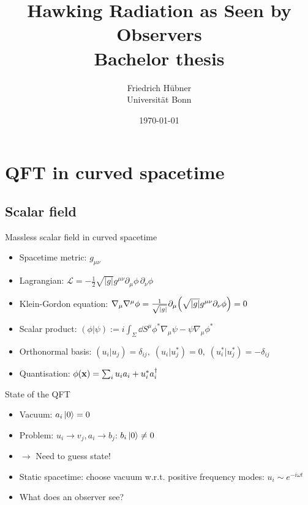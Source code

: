 \documentclass{beamer}
\title[Hawking Radiation for Observers]{\vspace{1cm}Hawking Radiation as Seen by Observers\\\small{Bachelor thesis}}
\author[Friedrich Hübner]{Friedrich Hübner\\Universität Bonn}
\date{\today}
\begin{document}
\beamertemplatenavigationsymbolsempty
\titlepage

\frame{\tableofcontents}

\section{QFT in curved spacetime}
\subsection{Scalar field}
\begin{frame}{Massless scalar field in curved spacetime}
\begin{itemize}
	\item Spacetime metric: \(g_{\mu\nu}\)
	\item Lagrangian: \(\mathcal{L} = -\frac{1}{2}\sqrt{|g|} g^{\mu\nu} \partial_\mu \phi\,\partial_\nu \phi\)
	\item Klein-Gordon equation: \(\nabla_\mu\nabla^\mu \phi = \frac{1}{\sqrt{|g|}}\partial_\mu \qty(\sqrt{|g|} g^{\mu\nu} \partial_\nu \phi) = 0\)
	\item Scalar product: \((\phi|\psi) := i \int_{\Sigma}\dd{S^\mu} \phi^*\nabla_\mu \psi - \psi\nabla_\mu \phi^*\)
	\item Orthonormal basis: \((u_i|u_j) = \delta_{ij},\;(u_i|u_j^*) = 0,\;(u_i^*|u_j^*) = -\delta_{ij}\)
	\item Quantisation: \(\phi(\vb{x}) = \sum_i u_i a_i + u_i^*a_i^\dagger\)
\end{itemize}
\end{frame}

\begin{frame}{State of the QFT}
\begin{itemize}
	\item Vacuum: \(a_i \ket*{0} = 0\)
	\item Problem: \(u_i \to v_j, a_i \to b_j\): \(b_i \ket*{0} \neq 0\)
	\item[] \(\to\) Need to guess state!
	\item Static spacetime: choose vacuum w.r.t. positive frequency modes: \(u_i \sim e^{-i\omega t}\)
	\item What does an observer see? 
\end{itemize}
\end{frame}
\end{document}
